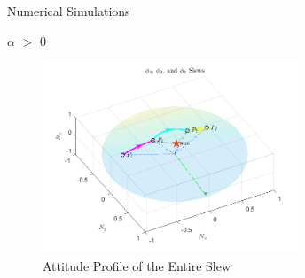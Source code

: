 \documentclass{beamer}
\begin{document}
\begin{frame}{Numerical Simulations}
	\begin{block}{$\alpha$ $>$ 0}
		\begin{figure}[H]
			\label{fig:phi1_phi2_phi3}
			\includegraphics[width=3in]{figures/alphaNot0/phi1_phi2_phi3.png}
			\caption{Attitude Profile of the Entire Slew}
		\end{figure}
	\end{block}
\end{frame}
\end{document}
